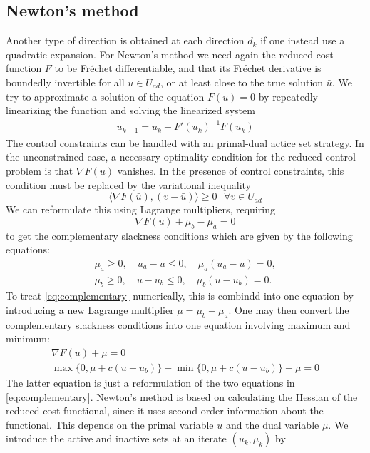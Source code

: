 \subsection{Newton's method}
Another type of direction is obtained at each direction $d_k$ if one instead use a quadratic expansion. For Newton's method we need again the reduced cost function $F$ to be Fréchet differentiable, and that its Fréchet derivative is boundedly invertible for all $u \in U_{ad}$, or at least close to the true solution $\bar{u}$. We try to approximate a solution of the equation $F(u) = 0$ by repeatedly linearizing the function and solving the linearized system
\begin{align}
    \label{eq:Newton}
    u_{k+1} = u_k - F'(u_k)^{-1}F(u_k)
\end{align}
The control constraints can be handled with an primal-dual actice set strategy. In the unconstrained case, a necessary optimality condition for the reduced control problem is that $\nabla F(u)$ vanishes. In the presence of control constraints, this condition must be replaced by the variational inequality
\begin{equation}
    \langle \nabla F(\bar{u}), (v-\bar{u}) \rangle \geq 0 \text{ } \forall v \in U_{ad}
\end{equation}
We can reformulate this using Lagrange multipliers, requiring 
\begin{equation*}
    \nabla F(u) + \mu_b - \mu_a =0 
\end{equation*}
to get the complementary slackness conditions which are given by the following equations:
\begin{align}
    \label{eq:complementary}
    \mu_a \geq 0, \quad u_a - u \leq 0, \quad \mu_a(u_a - u) = 0, \\
    \mu_b \geq 0, \quad u - u_b \leq 0, \quad \mu_b(u-u_b) =0.
\end{align}
To treat \eqref{eq:complementary} numerically, this is combindd into one equation by introducing a new Lagrange multiplier $\mu = \mu_b - \mu_a$. One may then convert the complementary slackness conditions into one equation involving maximum and minimum: 
\begin{align}
    \label{eq:finalComp}
    \nabla F(u) + \mu = 0 \\
    \max \{0, \mu + c(u-u_b) \} + \min \{0, \mu + c(u-u_b) \} - \mu = 0
\end{align}
%
The latter equation is just a reformulation of the two equations in \eqref{eq:complementary}. Newton's method is based on calculating the Hessian of the reduced cost functional, since it uses second order information about the functional. This depends on the primal variable $u$ and the dual variable $\mu$. We introduce the active and inactive sets at an iterate $(u_k, \mu_k)$ by 
